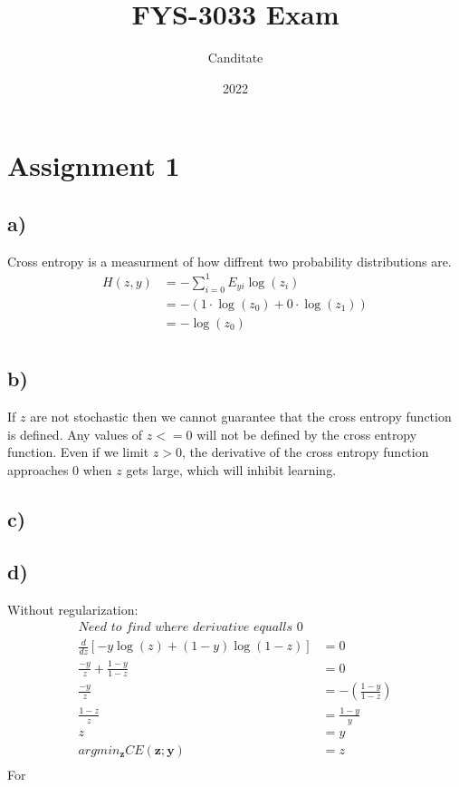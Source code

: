 \documentclass{article}
\title{FYS-3033 Exam}
\author{Canditate}
\date{2022}
\begin{document}
\maketitle
\section{Assignment 1}
\subsection*{a)}
Cross entropy is a measurment of how diffrent two probability distributions are.
\begin{equation}
    \begin{split}
        H(z,y) &= -\sum_{i=0}^1 E_{yi}\log(z_i)\\
        &= -\left(1\cdot\log(z_0)+0\cdot\log(z_1)\right)\\
        &= -\log(z_0)\\    
    \end{split}
\end{equation}

\subsection*{b)}
If $z$ are not stochastic then we cannot guarantee that the cross entropy function is defined. Any values of $z <= 0$ will not be defined by the cross entropy function. Even if we limit $z > 0$, the derivative of the cross entropy function approaches $0$ when $z$ gets large, which will inhibit learning.

\subsection*{c)}
\subsection*{d)}

Without regularization:
\begin{equation}
    \begin{split} 
        \textit{Need to find where derivative equalls 0}\\
        \frac{d}{dz}\left[-y\log(z)+(1-y)\log(1-z)\right] &= 0\\
        \frac{-y}{z}+\frac{1-y}{1-z} &= 0\\
        \frac{-y}{z} &= -\left(\frac{1-y}{1-z}\right)\\
        \frac{1-z}{z} &= \frac{1-y}{y}\\
        z&=y\\
        argmin_\mathbf{z} CE(\mathbf{z}; \mathbf{y})&=z\\
    \end{split}
\end{equation}
For 
\end{document}
